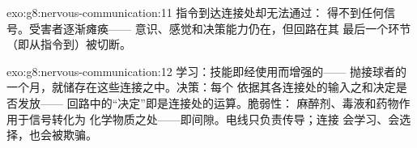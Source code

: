 \begin{solution}{exo:g8:nervous-communication:11}
指令到达连接处却无法通过：
得不到任何信号。受害者逐渐瘫痪——
意识、感觉和决策能力仍在，但回路在其
最后一个环节（即从指令到）被切断。
\end{solution}

\begin{solution}{exo:g8:nervous-communication:12}
学习：技能即经使用而增强的——
抛接球者的一个月，就储存在这些连接之中。决策：每个
依据其各连接处的输入之和决定是否发放——
回路中的“决定”即是连接处的运算。脆弱性：
麻醉剂、毒液和药物作用于信号转化为
化学物质之处——即间隙。电线只负责传导；连接
会学习、会选择，也会被欺骗。
\end{solution}

